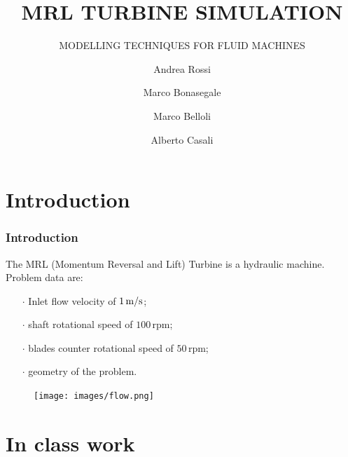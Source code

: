 \documentclass{beamer}
\title[MRL TURBINE]{MRL TURBINE SIMULATION}
\subtitle{MODELLING TECHNIQUES FOR FLUID MACHINES}
\author[AR MB MB AC]{Andrea Rossi \and Marco Bonasegale \and Marco Belloli \and Alberto Casali}
\date{}
\begin{document}

\begin{frame}
\titlepage
\end{frame}

\addtocounter{framenumber}{-1}


%







\section{Introduction}

\begin{frame}
\frametitle{Introduction}
The MRL (Momentum Reversal and Lift) Turbine is a hydraulic machine.
Problem data are:
\begin{itemize}
\item[$\cdot$] Inlet flow velocity of $1\,\text{m}/\text{s}$;
\item[$\cdot$] shaft rotational speed of $100 \, \text{rpm}$;
\item[$\cdot$] blades counter rotational speed of $50 \, \text{rpm}$;
\item[$\cdot$] geometry of the problem.
\end{itemize}

\begin{center}
\begin{figure}
\texttt{[image: images/flow.png]} 

\end{figure}
\end{center}


\end{frame}

\section{In class work}
\end{document}

